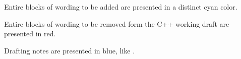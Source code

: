 \begin{addedblock}
Entire blocks of wording to be added are presented in a distinct cyan color.
\end{addedblock}



\begin{removedblock}
Entire blocks of wording to be removed form the C++ working draft are presented 
in red.
\end{removedblock}

\textcolor{noteclr}{Drafting notes are presented in blue, like }.

